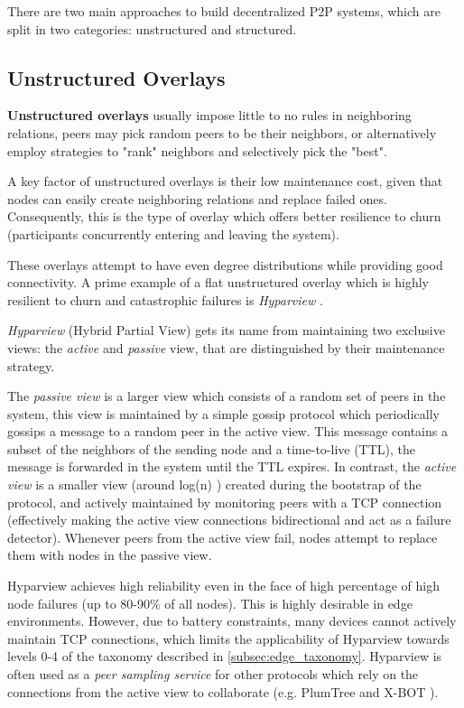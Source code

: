 There are two main approaches to build decentralized P2P systems, which are split in two categories: unstructured and structured. 

\subsection{Unstructured Overlays}

\textbf{Unstructured overlays} usually impose little to no rules in neighboring relations, peers may pick random peers to be their neighbors, or alternatively employ strategies to "rank" neighbors and selectively pick the "best".

A key factor of unstructured overlays is their low maintenance cost, given that nodes can easily create neighboring relations and replace failed ones. Consequently, this is the type of overlay which offers better resilience to churn \cite{stutzbach2006understanding} (participants concurrently entering and leaving the system).

These overlays attempt to have even degree distributions while providing good connectivity. A prime example of a flat unstructured overlay which is highly resilient to churn and catastrophic failures is \textit{Hyparview} \cite{Hyparview}. 

\textit{Hyparview} (Hybrid Partial View) gets its name from maintaining two exclusive views: the \textit{active} and \textit{passive} view, that are distinguished by their maintenance strategy. 

The \textit{passive view} is a larger view which consists of a random set of peers in the system, this view is maintained by a simple gossip protocol which periodically gossips a message to a random peer in the active view. This message contains a subset of the neighbors of the sending node and a time-to-live (TTL), the message is forwarded in the system until the TTL expires. In contrast, the \textit{active view} is a smaller view (around log(n) ) created during the bootstrap of the protocol, and actively maintained by monitoring peers with a TCP connection (effectively making the active view connections bidirectional and act as a failure detector). Whenever peers from the active view fail, nodes attempt to replace them with nodes in the passive view.

Hyparview achieves high reliability even in the face of high percentage of high node failures (up to 80-90\% of all nodes). This is highly desirable in edge environments. However, due to battery constraints, many devices cannot actively maintain TCP connections, which limits the applicability of Hyparview towards levels 0-4 of the taxonomy described in \ref{subsec:edge_taxonomy}. Hyparview is often used as a \textit{peer sampling service} for other protocols which rely on the connections from the active view to collaborate  (e.g. PlumTree \cite{leitao2007epidemic} and X-BOT \cite{leitao2012x}).

